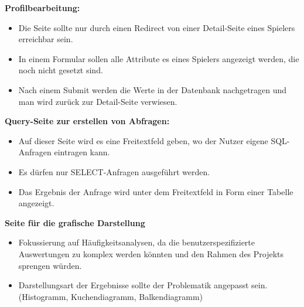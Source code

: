 \noindent\textbf{Profilbearbeitung:}
\begin{itemize}
\item Die Seite sollte nur durch einen Redirect von einer Detail-Seite eines Spielers erreichbar sein.
\item In einem Formular sollen alle Attribute es eines Spielers angezeigt werden, die noch nicht gesetzt sind.
\item Nach einem Submit werden die Werte in der Datenbank nachgetragen und man wird zurück zur Detail-Seite verwiesen.
\end{itemize}

\noindent\textbf{Query-Seite zur erstellen von Abfragen:}
\begin{itemize}
\item Auf dieser Seite wird es eine Freitextfeld geben, wo der Nutzer eigene SQL-Anfragen eintragen kann.
\item Es dürfen nur SELECT-Anfragen ausgeführt werden.
\item Das Ergebnis der Anfrage wird unter dem Freitextfeld in Form einer Tabelle angezeigt.
\end{itemize}

\noindent\textbf{Seite für die grafische Darstellung}
\begin{itemize}
\item Fokussierung auf Häufigkeitsanalysen, da die benutzerspezifizierte Auswertungen zu komplex werden könnten und den Rahmen des Projekts sprengen würden.
\item Darstellungsart der Ergebnisse sollte der Problematik angepasst sein. (Histogramm, Kuchendiagramm, Balkendiagramm) 
\end{itemize}